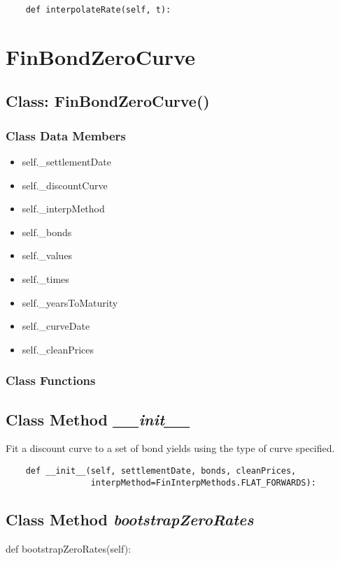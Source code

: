 \documentclass[twoside,11pt]{book}
\begin{document}
\begin{lstlisting}
    def interpolateRate(self, t):
\end{lstlisting}

\newpage
\section{FinBondZeroCurve}

\subsection{Class: FinBondZeroCurve()}


\subsubsection{Class Data Members}
\begin{itemize}
\item{self.\_settlementDate}
\item{self.\_discountCurve}
\item{self.\_interpMethod}
\item{self.\_bonds}
\item{self.\_values}
\item{self.\_times}
\item{self.\_yearsToMaturity}
\item{self.\_curveDate}
\item{self.\_cleanPrices}
\end{itemize}

\subsubsection{Class Functions}

\subsection{Class Method {\it \_\_init\_\_}}
Fit a discount curve to a set of bond yields using the type of curve specified. 

\begin{lstlisting}
    def __init__(self, settlementDate, bonds, cleanPrices,
                 interpMethod=FinInterpMethods.FLAT_FORWARDS):
\end{lstlisting}

\subsection{Class Method {\it bootstrapZeroRates}}
def bootstrapZeroRates(self):
\end{document}
